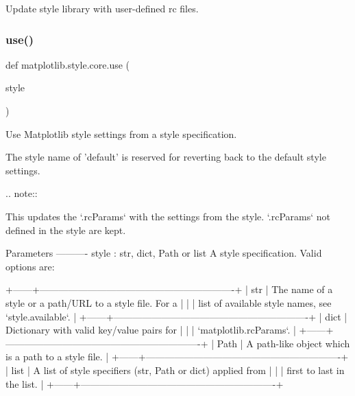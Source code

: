 \begin{DoxyVerb}Update style library with user-defined rc files.\end{DoxyVerb}
 \mbox{\label{namespacematplotlib_1_1style_1_1core_a7a3b0dabe53194cb84ce4f20e0ac5629}} 
\subsubsection{\texorpdfstring{use()}{use()}}
{\footnotesize\ttfamily def matplotlib.\+style.\+core.\+use (\begin{DoxyParamCaption}\item[{}]{style }\end{DoxyParamCaption})}

\begin{DoxyVerb}Use Matplotlib style settings from a style specification.

The style name of 'default' is reserved for reverting back to
the default style settings.

.. note::

   This updates the `.rcParams` with the settings from the style.
   `.rcParams` not defined in the style are kept.

Parameters
----------
style : str, dict, Path or list
    A style specification. Valid options are:

    +------+-------------------------------------------------------------+
    | str  | The name of a style or a path/URL to a style file. For a    |
    |      | list of available style names, see `style.available`.       |
    +------+-------------------------------------------------------------+
    | dict | Dictionary with valid key/value pairs for                   |
    |      | `matplotlib.rcParams`.                                      |
    +------+-------------------------------------------------------------+
    | Path | A path-like object which is a path to a style file.         |
    +------+-------------------------------------------------------------+
    | list | A list of style specifiers (str, Path or dict) applied from |
    |      | first to last in the list.                                  |
    +------+-------------------------------------------------------------+\end{DoxyVerb}
 

